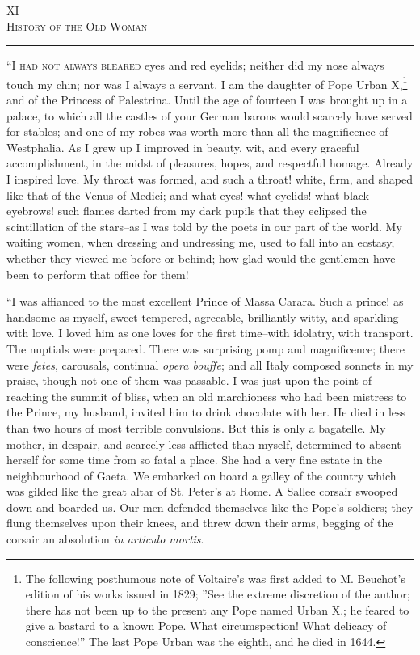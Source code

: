 \begin{center}
XI\\
\textsc{History of the Old Woman}
\end{center}
\vspace{-0.5cm}
\rule{\textwidth}{0.5pt}
\lettrine{``I}{ had not always bleared} eyes and red eyelids; neither did my nose always touch my chin; nor was I always a servant. I am the daughter of Pope Urban X,\footnote{The following posthumous note of Voltaire's was first added to M. Beuchot's edition of his works issued in 1829; ''See the extreme discretion of the author; there has not been up to the present any Pope named Urban X.; he feared to give a bastard to a known Pope. What circumspection! What delicacy of conscience!'' The last Pope Urban was the eighth, and he died in 1644.} and of the Princess of Palestrina. Until the age of fourteen I was brought up in a palace, to which all the castles of your German barons would scarcely have served for stables; and one of my robes was worth more than all the magnificence of Westphalia. As I grew up I improved in beauty, wit, and every graceful accomplishment, in the midst of pleasures, hopes, and respectful homage. Already I inspired love. My throat was formed, and such a throat! white, firm, and shaped like that of the Venus of Medici; and what eyes! what eyelids! what black eyebrows! such flames darted from my dark pupils that they eclipsed the scintillation of the stars--as I was told by the poets in our part of the world. My waiting women, when dressing and undressing me, used to fall into an ecstasy, whether they viewed me before or behind; how glad would the gentlemen have been to perform that office for them!

``I was affianced to the most excellent Prince of Massa Carara. Such a prince! as handsome as myself, sweet-tempered, agreeable, brilliantly witty, and sparkling with love. I loved him as one loves for the first time--with idolatry, with transport. The nuptials were prepared. There was surprising pomp and magnificence; there were \textit{fetes}, carousals, continual \textit{opera bouffe}; and all Italy composed sonnets in my praise, though not one of them was passable. I was just upon the point of reaching the summit of bliss, when an old marchioness who had been mistress to the Prince, my husband, invited him to drink chocolate with her. He died in less than two hours of most terrible convulsions. But this is only a bagatelle. My mother, in despair, and scarcely less afflicted than myself, determined to absent herself for some time from so fatal a place. She had a very fine estate in the neighbourhood of Gaeta. We embarked on board a galley of the country which was gilded like the great altar of St. Peter's at Rome. A Sallee corsair swooped down and boarded us. Our men defended themselves like the Pope's soldiers; they flung themselves upon their knees, and threw down their arms, begging of the corsair an absolution \textit{in articulo mortis}.

